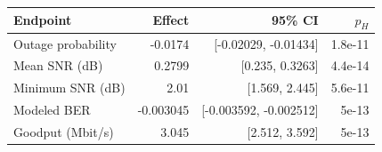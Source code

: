 \begin{tabular}{lrrr}
\toprule
Endpoint & Effect & 95\% CI & $p_H$ \\
\midrule
Outage probability & -0.0174 & [-0.02029, -0.01434] & 1.8e-11 \\
Mean SNR (dB) & 0.2799 & [0.235, 0.3263] & 4.4e-14 \\
Minimum SNR (dB) & 2.01 & [1.569, 2.445] & 5.6e-11 \\
Modeled BER & -0.003045 & [-0.003592, -0.002512] & 5e-13 \\
Goodput (Mbit/s) & 3.045 & [2.512, 3.592] & 5e-13 \\
\bottomrule
\end{tabular}

